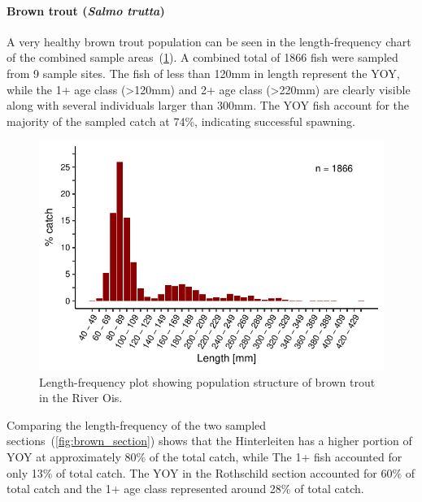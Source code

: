 \paragraph{Brown trout (\textit{Salmo trutta})}\label{sec:ois_bt_lf}

A very healthy brown trout population can be seen in the length-frequency chart of the combined sample areas~(\cref{fig:brown_single}). A combined total of 1866 fish were sampled from 9 sample sites. The fish of less than 120mm in length represent the YOY, while the 1+ age class (\textgreater120mm) and 2+ age class (\textgreater220mm) are clearly visible along with several individuals larger than 300mm. The YOY fish account for the majority of the sampled catch at 74\%, indicating successful spawning.

\begin{figure}[!htb]                              %
	\center
	\includegraphics[width=.7\textwidth]{images/brown_single.pdf}                %
	\caption{Length-frequency plot showing population structure of brown trout in the River Ois.}        %
	\label{fig:brown_single}                                                       %
\end{figure}

Comparing the length-frequency of the two sampled sections~(\cref{fig:brown_section}) shows that the Hinterleiten has a higher portion of YOY at approximately 80\% of the total catch, while The 1+ fish accounted for only 13\% of total catch. The YOY in the Rothschild section accounted for 60\% of total catch and the 1+ age class represented around 28\% of total catch.

